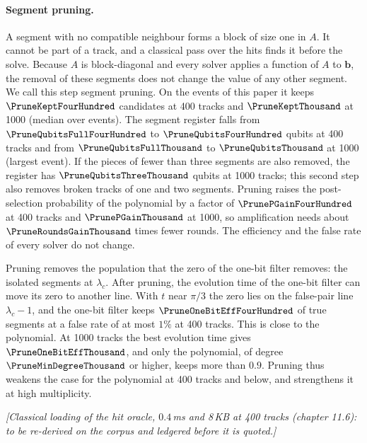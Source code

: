 \documentclass[11pt,a4paper]{article}
\newcommand{\gss}[1]{{\color{teal} #1}}
\begin{document}
\paragraph{\gss{Segment pruning.}}
\gss{A segment with no compatible neighbour forms a block of size one in $A$. It cannot be part of a track, and a classical pass over the hits finds it before the solve. Because $A$ is block-diagonal and every solver applies a function of $A$ to $\mathbf{b}$, the removal of these segments does not change the value of any other segment. We call this step segment pruning. On the events of this paper it keeps $\PruneKeptFourHundred$ candidates at 400 tracks and $\PruneKeptThousand$ at 1000 (median over events). The segment register falls from $\PruneQubitsFullFourHundred$ to $\PruneQubitsFourHundred$ qubits at 400 tracks and from $\PruneQubitsFullThousand$ to $\PruneQubitsThousand$ at 1000 (largest event). If the pieces of fewer than three segments are also removed, the register has $\PruneQubitsThreeThousand$ qubits at 1000 tracks; this second step also removes broken tracks of one and two segments. Pruning raises the post-selection probability of the polynomial by a factor of $\PrunePGainFourHundred$ at 400 tracks and $\PrunePGainThousand$ at 1000, so amplification needs about $\PruneRoundsGainThousand$ times fewer rounds. The efficiency and the false rate of every solver do not change.}

\gss{Pruning removes the population that the zero of the one-bit filter removes: the isolated segments at $\lambda_c$. After pruning, the evolution time of the one-bit filter can move its zero to another line. With $t$ near $\pi/3$ the zero lies on the false-pair line $\lambda_c-1$, and the one-bit filter keeps $\PruneOneBitEffFourHundred$ of true segments at a false rate of at most $1\%$ at 400 tracks. This is close to the polynomial. At 1000 tracks the best evolution time gives $\PruneOneBitEffThousand$, and only the polynomial, of degree $\PruneMinDegreeThousand$ or higher, keeps more than $0.9$. Pruning thus weakens the case for the polynomial at 400 tracks and below, and strengthens it at high multiplicity.}

\textit{[Classical loading of the hit oracle, $0.4$\,ms and 8\,KB at 400 tracks (chapter 11.6):
to be re-derived on the corpus and ledgered before it is quoted.]}
\end{document}
